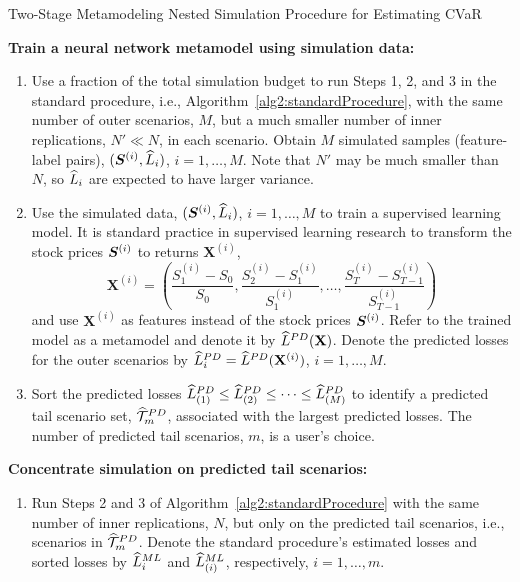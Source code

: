 \begin{algorithm}
\caption{Two-Stage Metamodeling Nested Simulation Procedure for Estimating CVaR}
\begin{algorithmic}[1] \label{alg2:twoStageProcedure}
    \STATE \textbf{Train a neural network metamodel using simulation data:}
    \begin{enumerate} [label=\alph*., itemsep=0pt, parsep=0pt, topsep=0pt]
        \item Use a fraction of the total simulation budget to run Steps 1, 2, and 3 in the standard procedure, i.e., Algorithm~\ref{alg2:standardProcedure}, with the same number of outer scenarios, $M$, but a much smaller number of inner replications, $N' \ll N$, in each scenario. 
        Obtain $M$ simulated samples (feature-label pairs), $(\bm{S}^{(i)}, \widehat{L}_i)$, $i=1,\ldots,M$. 
        Note that $N'$ may be much smaller than $N$, so $\widehat{L}_i$ are expected to have larger variance.
        \item Use the simulated data, $(\bm{S}^{(i)}, \widehat{L}_i)$, $i=1,\ldots,M$ to train a supervised learning model. 
        It is standard practice in supervised learning research to transform the stock prices $\bm{S}^{(i)}$ to returns $\mathbf{X}^{(i)}$,
        \begin{equation} \label{eq2:return}
        \mathbf{X}^{(i)} = \left(\frac{S_1^{(i)} - S_0}{S_0}, \frac{S_2^{(i)} - S_1^{(i)}}{S_1^{(i)}}, \ldots, \frac{S_T^{(i)} - S_{T-1}^{(i)}}{S_{T-1}^{(i)}}\right)
        \end{equation}
        and use $\mathbf{X}^{(i)}$ as features instead of the stock prices $\bm{S}^{(i)}$.
        Refer to the trained model as a metamodel and denote it by $\widehat{L}^{PD}(\mathbf{X})$. Denote the predicted losses for the outer scenarios by $\widehat{L}^{PD}_i = \widehat{L}^{PD}(\mathbf{X}^{(i)})$, $i=1,\ldots,M$.
        \item Sort the predicted losses $\widehat{L}^{PD}_{(1)}\leq \widehat{L}^{PD}_{(2)} \leq \cdots\leq \widehat{L}^{PD}_{(M)}$ to identify a predicted tail scenario set, $\widehat{\mathcal{T}}_{m}^{PD}$, associated with the largest predicted losses. The number of predicted tail scenarios, $m$, is a user's choice.
    \end{enumerate}
    \STATE \textbf{Concentrate simulation on predicted tail scenarios:}
    \begin{enumerate} [label=\alph*., itemsep=0pt, parsep=0pt, topsep=0pt]
        \item Run Steps 2 and 3 of Algorithm~\ref{alg2:standardProcedure} with the same number of inner replications, $N$, but only on the predicted tail scenarios, i.e., scenarios in $\widehat{\mathcal{T}}_{m}^{PD}$. Denote the standard procedure's estimated losses and sorted losses by $\widehat{L}^{ML}_i$ and $\widehat{L}^{ML}_{(i)}$, respectively, $i=1,\ldots,m$.

\end{enumerate}
\end{algorithmic}
\end{algorithm}
